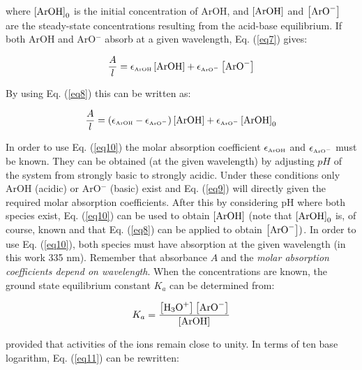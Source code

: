 \documentclass[byrevtex,amssymb,aps,pra,floatfix,letterpaper]{revtex4}
\begin{document}
\noindent
where $\left[\textnormal{ArOH}\right]_0$ is the initial concentration of ArOH, and $\left[\textnormal{ArOH}\right]$ and $\left[\textnormal{ArO}^-\right]$ are the steady-state concentrations resulting from the acid-base equilibrium. If both ArOH and ArO$^-$ absorb at a given wavelength, Eq. (\ref{eq7}) gives:

\begin{equation}
\label{eq9}
\frac{A}{l} = \epsilon_\textnormal{\tiny ArOH} \left[\textnormal{ArOH}\right] + \epsilon_{\textnormal{\tiny ArO}^-} \left[\textnormal{ArO}^-\right]
\end{equation}

\noindent
By using Eq. (\ref{eq8}) this can be written as:

\begin{equation}
\label{eq10}
\frac{A}{l} = \left(\epsilon_\textnormal{\tiny ArOH} - \epsilon_{\textnormal{\tiny ArO}^-}\right)\left[\textnormal{ArOH}\right] + \epsilon_{\textnormal{\tiny ArO}^-}\left[\textnormal{ArOH}\right]_0
\end{equation}

\noindent
In order to use Eq. (\ref{eq10}) the molar absorption coefficient $\epsilon_\textnormal{\tiny ArOH}$ and $\epsilon_{\textnormal{\tiny ArO}^-}$ must be known. They can be obtained (at the given wavelength) by adjusting $pH$ of the system from strongly basic to strongly acidic. Under these conditions only ArOH (acidic) or ArO$^-$ (basic) exist and Eq. (\ref{eq9}) will directly given the required molar absorption coefficients. After this by considering pH where both species exist, Eq. (\ref{eq10}) can be used to obtain
$\left[\textnormal{ArOH}\right]$ (note that $\left[\textnormal{ArOH}\right]_0$ is, of course, known and that Eq. (\ref{eq8}) can be applied to obtain $\left[\textnormal{ArO}^-\right])$. In order to use Eq. (\ref{eq10}), both species must have absorption at the given wavelength (in this work 335 nm). Remember that absorbance $A$ and the \textit{molar absorption coefficients depend on wavelength}. When the concentrations are known, the ground state equilibrium constant $K_a$ can be determined from:

\begin{equation}
\label{eq11}
K_a = \frac{\left[\textnormal{H}_3\textnormal{O}^+\right]\left[\textnormal{ArO}^-\right]}{\left[\textnormal{ArOH}\right]}
\end{equation}

\noindent
provided that activities of the ions remain close to unity. In terms of ten base logarithm, Eq. (\ref{eq11}) can be rewritten:
\end{document}
